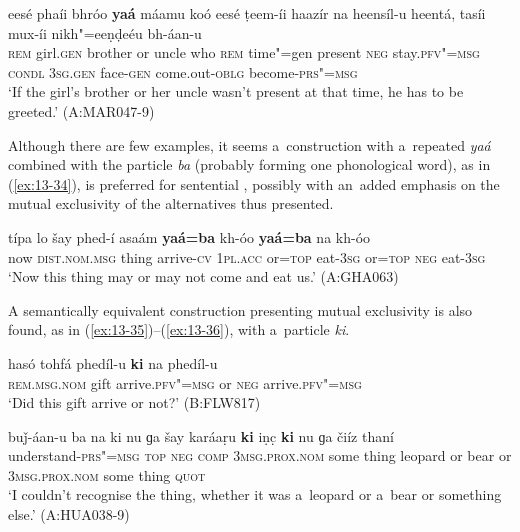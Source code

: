 \ea
\label{ex:13-33}
\gll eesé phaíi {\ob}bhróo \textbf{yaá} máamu{\cb} koó eesé ṭeem-íi haazír na heensíl-u heentá, tasíi mux-íi nikh"=eeṇḍeéu bh-áan-u \\
\textsc{rem} girl.\textsc{gen} brother or uncle who \textsc{rem} time"=gen  present \textsc{neg} stay.\textsc{pfv"=msg} \textsc{condl} \textsc{3sg.gen} face-\textsc{gen}  come.out-\textsc{oblg} become-\textsc{prs"=msg}  \\
\glt `If the girl's brother or her uncle wasn't present at that time, he has to be greeted.' (A:MAR047-9) 
\z

 Although there are few examples, it seems a~construction with a~repeated \textit{yaá} combined with the particle \textit{ba} (probably forming one phonological word), as in (\ref{ex:13-34}), is preferred for sentential , possibly with an~added emphasis on the mutual exclusivity of the alternatives thus presented. 

\begin{exe}
\ex
\label{ex:13-34}
\gll típa lo šay phed-í asaám {\ob}\textbf{yaá=ba} kh-óo \textbf{yaá=ba} na kh-óo{\cb} \\
now \textsc{dist.nom.msg} thing arrive-\textsc{cv} \textsc{1pl.acc} or=\textsc{top} eat-\textsc{3sg} or=\textsc{top} \textsc{neg} eat-\textsc{3sg} \\
\glt `Now this thing may or may not come and eat us.' (A:GHA063) 
\end{exe}

 A semantically equivalent construction presenting mutual exclusivity is also found, as in (\ref{ex:13-35})--(\ref{ex:13-36}), with a~particle \textit{ki}. 

\begin{exe}
\ex
\label{ex:13-35}
\gll hasó tohfá {\ob}phedíl-u \textbf{ki} na phedíl-u{\cb}\\
\textsc{rem.msg.nom} gift arrive.\textsc{pfv"=msg} or \textsc{neg}  arrive.\textsc{pfv"=msg} \\
\glt `Did this gift arrive or not?' (B:FLW817)

\ex
\label{ex:13-36}
\gll buǰ-áan-u ba na ki nu ɡa šay {\ob}karáaṛu \textbf{ki} iṇc̣ \textbf{ki} nu ɡa čiíz{\cb} thaní \\
understand-\textsc{prs"=msg} \textsc{top} \textsc{neg} \textsc{comp} \textsc{3msg.prox.nom}  some thing leopard or bear or \textsc{3msg.prox.nom} some thing \textsc{quot} \\
\glt `I couldn't recognise the thing, whether it was a~leopard or a~bear or something else.' (A:HUA038-9) 
\end{exe}

